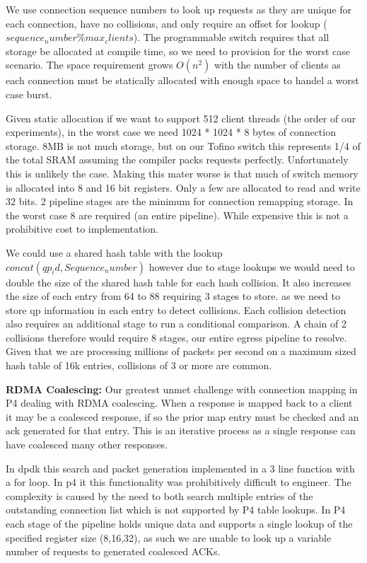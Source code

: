 We use connection sequence numbers to look up requests as they are unique for
each connection, have no collisions, and only require an offset for lookup
($sequence_number \% max_clients$). The programmable switch requires that all
storage be allocated at compile time, so we need to provision for the worst case
scenario.  The space requirement grows $O(n^2)$ with the number of clients as
each connection must be statically allocated with enough space to handel a worst
case burst.

Given static allocation if we want to support 512 client threads (the order of
our experiments), in the worst case we need 1024 * 1024 * 8 bytes of connection
storage. 8MB is not much storage, but on our Tofino switch this represents 1/4
of the total SRAM assuming the compiler packs requests perfectly. Unfortunately
this is unlikely the case.  Making this mater worse is that much of switch
memory is allocated into 8 and 16 bit registers. Only a few are allocated to
read and write 32 bits. 2 pipeline stages are the minimum for connection
remapping storage. In the worst case 8 are required (an entire pipeline). While
expensive this is not a prohibitive cost to implementation.

We could use a shared hash table with the lookup $concat(qp_id,Sequence_number)$
however due to stage lookups we would need to double the size of the shared hash
table for each hash collision. It also increases the size of each entry from 64
to 88 requiring 3 stages to store. as we need to store qp information in each
entry to detect collisions.  Each collision detection also requires an
additional stage to run a conditional comparison. A chain of 2 collisions
therefore would require 8 stages, our entire egress pipeline to resolve. Given
that we are processing millions of packets per second on a maximum sized hash
table of 16k entries, collisions of 3 or more are common.

\textbf{RDMA Coalescing:} Our greatest unmet challenge with connection mapping
in P4 dealing with RDMA coalescing. When a response is mapped back to a client
it may be a coalesced response, if so the prior map entry must be checked and an
ack generated for that entry. This is an iterative process as a single response
can have coalesced many other responses.

In dpdk this search and packet generation implemented in a 3 line function with
a for loop. In p4 it this functionality was prohibitively difficult to engineer.
The complexity is caused by the need to both search multiple entries of the
outstanding connection list which is not supported by P4 table lookups. In P4
each stage of the pipeline holds unique data and supports a single lookup of the
specified register size (8,16,32), as such we are unable to look up a variable
number of requests to generated coalesced ACKs.

